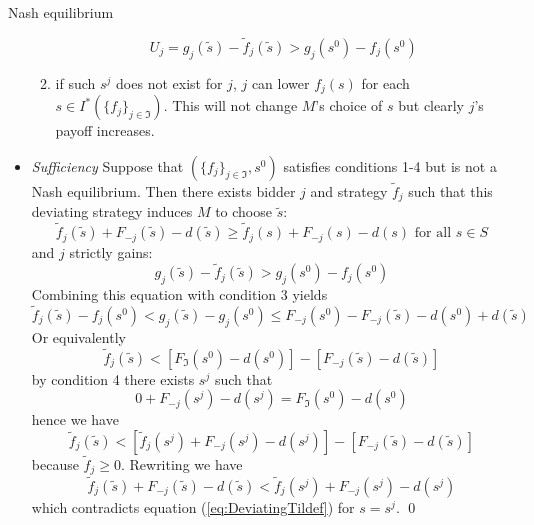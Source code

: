 \documentclass[11pt,english]{beamer}
\begin{document}
\begin{frame}[allowframebreaks]{Nash equilibrium}
\begin{itemize}
\begin{enumerate}
\begin{equation*}
        U_j = g_j(\tilde{s})-\tilde{f}_j(\tilde{s}) > g_j(s^0)-f_j(s^0)
      \end{equation*}
    \item if such $s^j$ does not exist for $j$, $j$ can lower $f_j(s)$
      for each $s \in I^*(\{f_j\}_{j \in \Im})$. This will not change
      $M$'s choice of $s$ but clearly $j$'s payoff increases.
    \end{enumerate}
  \item \emph{Sufficiency} Suppose that $(\{f_j\}_{j \in \Im},s^0)$
    satisfies conditions 1-4 but is not a Nash equilibrium. Then there
    exists bidder $j$ and strategy $\tilde{f}_j$ such that this
    deviating strategy induces $M$ to choose $\tilde{s}$:
    \begin{equation}
      \label{eq:DeviatingTildef}
      \tilde{f}_j(\tilde{s}) +F_{-j}(\tilde{s})-d(\tilde{s}) \geq
      \tilde{f}_j(s)+F_{-j}(s)-d(s) \text{ for all } s \in S
    \end{equation}
    and $j$ strictly gains:
    \begin{equation}
      \label{eq:jGains}
      g_j(\tilde{s})-\tilde{f}_j(\tilde{s}) > g_j(s^0)-f_j(s^0)
    \end{equation}
    Combining this equation with condition 3 yields
    \begin{equation*}
      \tilde{f}_j(\tilde{s})-f_j(s^0) < g_j(\tilde{s})-g_j(s^0) \leq
      F_{-j}(s^0)-F_{-j}(\tilde s) - d(s^0) +d(\tilde s)
    \end{equation*}
    Or equivalently
    \begin{equation*}
      \tilde{f}_j(\tilde{s}) < [F_{\Im}(s^0) - d(s^0)] -[F_{-j}(\tilde s) -d(\tilde s)]
    \end{equation*}
    by condition 4 there exists $s^j$ such that
    \begin{equation*}
      0+F_{-j}(s^j)-d(s^j) = F_{\Im}(s^0) - d(s^0)
    \end{equation*}
    hence we have
    \begin{equation*}
      \tilde{f}_j(\tilde{s}) < [\tilde f_j(s^j)+F_{-j}(s^j)-d(s^j)]  -[F_{-j}(\tilde s) -d(\tilde s)]
    \end{equation*}
    because $\tilde f_j \geq 0$.
    Rewriting we have
    \begin{equation*}
      \tilde{f}_j(\tilde{s}) +F_{-j}(\tilde s) -d(\tilde s) < \tilde f_j(s^j)+F_{-j}(s^j)-d(s^j)
    \end{equation*}
    which contradicts equation (\ref{eq:DeviatingTildef}) for
    $s=s^j$. \qed
  \end{itemize}
\end{frame}
\end{document}
